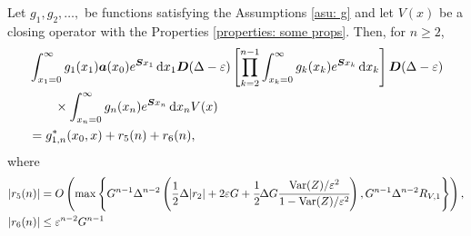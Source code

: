 \begin{lem}\label{lem: lst convergence}
	Let \(g_1,g_2,\dots,\) be functions satisfying the Assumptions \ref{asu: g} and let \(V(x)\) be a closing operator with the Properties \ref{properties: some props}. Then, for \(n\geq 2\),  
	\begin{align}
		&\int_{x_1=0}^\infty g_1(x_1) \boldsymbol a(x_0) e^{\boldsymbol{S}x_1}\, \mathrm{d} x_1 \boldsymbol D(\Delta-\varepsilon)
            	\left[\prod_{k=2}^{n-1}\int_{x_k=0}^\infty g_k(x_k) e^{\boldsymbol{S}x_k} \, \mathrm{d} x_k \right]
		\boldsymbol D(\Delta-\varepsilon) \nonumber 
		\\&\qquad\times\int_{x_n=0}^\infty g_{n}(x_n) e^{\boldsymbol{S}x_n} \, \mathrm{d} x_n V(x) \nonumber 
		\\& =g^{*}_{1,n}(x_0,x) + r_5(n) + r_6(n), \label{eqn: rhs g 2}
	\end{align}
	where  
	\begin{align*}
		|r_5(n)|&= O\left(\max\left\{G^{n-1}\Delta^{n-2}\left(\frac{1}{2}\Delta|r_2 |+ 2\varepsilon G 
		+ \cfrac{1}{2}\Delta G\cfrac{\mathrm{Var}(Z)/\varepsilon^2}{1-\mathrm{Var}(Z)/\varepsilon^2}\right),
		G^{n-1}\Delta^{n-2}R_{V,1}\right\}\right),
		\\|r_6(n)| &\leq \varepsilon^{n-2}G^{n-1}
	\end{align*}
\end{lem}
